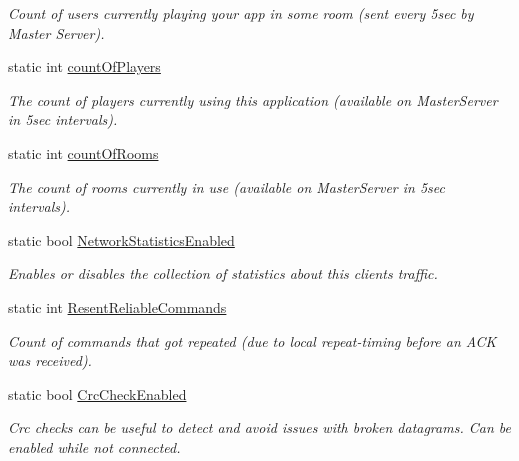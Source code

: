 \begin{DoxyCompactItemize}
\begin{DoxyCompactList}\small\item\em Count of users currently playing your app in some room (sent every 5sec by Master Server). \end{DoxyCompactList}\item 
static int \hyperlink{class_photon_network_a56b04c065a4f5d54e3f9113056b32da2}{count\+Of\+Players}
\begin{DoxyCompactList}\small\item\em The count of players currently using this application (available on Master\+Server in 5sec intervals). \end{DoxyCompactList}\item 
static int \hyperlink{class_photon_network_a6cbf85644c07b9ceb4b4a1accd0f4ce9}{count\+Of\+Rooms}
\begin{DoxyCompactList}\small\item\em The count of rooms currently in use (available on Master\+Server in 5sec intervals). \end{DoxyCompactList}\item 
static bool \hyperlink{class_photon_network_a67cb40d5f2dede55b03b2be1f792e93a}{Network\+Statistics\+Enabled}
\begin{DoxyCompactList}\small\item\em Enables or disables the collection of statistics about this client\textquotesingle{}s traffic. \end{DoxyCompactList}\item 
static int \hyperlink{class_photon_network_aaaf92ee5eec22fff548ee9bb735913b6}{Resent\+Reliable\+Commands}
\begin{DoxyCompactList}\small\item\em Count of commands that got repeated (due to local repeat-\/timing before an A\+CK was received). \end{DoxyCompactList}\item 
static bool \hyperlink{class_photon_network_ae995c021d1295f00afd9f87cd3bd118c}{Crc\+Check\+Enabled}
\begin{DoxyCompactList}\small\item\em Crc checks can be useful to detect and avoid issues with broken datagrams. Can be enabled while not connected.\end{DoxyCompactList}\item 

\end{DoxyCompactItemize}
